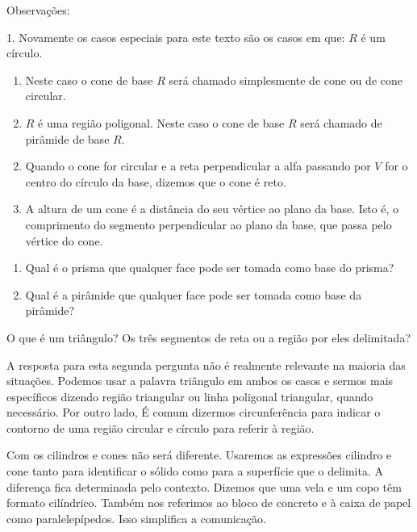 Observações:

1. Novamente os casos especiais para este texto são os casos em que:
\(R\) é um círculo.
\begin{enumerate}
\item {} 
Neste caso o cone de base \(R\) será chamado simplesmente de cone ou de cone circular.

\item {} 
\(R\) é uma região poligonal. Neste caso o cone de base \(R\) será chamado de pirâmide de base \(R\).

\end{enumerate}
\begin{enumerate}
\setcounter{enumi}{1}
\item {} 
Quando o cone for circular e a reta perpendicular a alfa passando por \(V\) for o centro do círculo da base, dizemos que o cone é reto.

\item {} 
A altura de um cone é a distância do seu vértice ao plano da base. Isto é, o comprimento do segmento perpendicular ao plano da base, que passa pelo vértice do cone.

\end{enumerate}

\begin{reflection}{}
\begin{enumerate}
\item {} 
Qual é o prisma que qualquer face pode ser tomada como base do prisma?

\item {} 
Qual é a pirâmide que qualquer face pode ser tomada como base da pirâmide?

\end{enumerate}
\end{reflection}

\begin{observation}{}

O que é um triângulo? Os três segmentos de  reta ou a região por eles delimitada?

A resposta para esta segunda pergunta não é realmente relevante na maioria das situações. Podemos usar a palavra triângulo em ambos os casos e sermos mais específicos dizendo região triangular ou linha poligonal triangular, quando necessário. Por outro lado, É comum dizermos circunferência para indicar o contorno de uma região circular e círculo para referir  à região.

Com os cilindros e cones não será diferente. Usaremos as expressões cilindro e cone tanto para identificar o sólido como para a superfície que o delimita. A diferença fica determinada pelo contexto. Dizemos que uma vela e um copo têm formato cilíndrico. Também nos referimos ao bloco de concreto e à caixa de papel como paralelepípedos. Isso simplifica a comunicação.
\end{observation}


